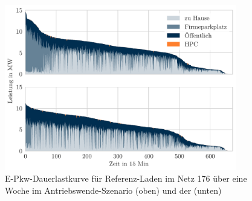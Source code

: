 \begin{figure}[H]
    \centering
    \includegraphics[width=0.9\textwidth]{Bilder/example_load_duration_curve}
    \caption{E-Pkw-Dauerlastkurve für Referenz-Laden im Netz \num{176} über eine Woche im Antriebswende-Szenario (oben) und der \SzeFirmenparkplatz (unten)}\label{fig:example_load_curve}
\end{figure}